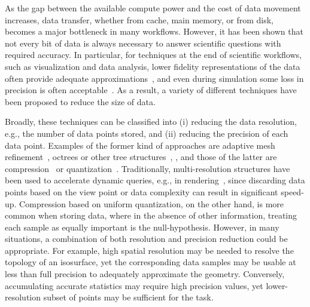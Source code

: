 As the gap between the available compute power and the cost of data movement
increases, data transfer, whether from cache, main memory, or from disk,
becomes a major bottleneck in many workflows. However, it has been shown that
not every bit of data is always necessary to answer scientific questions with
required accuracy. In particular, for techniques at the end of scientific
workflows, such as visualization and data analysis, lower fidelity
representations of the data often provide adequate
approximations~\cite{woodring2011,covra2012,compression_sim2013}, and even
during simulation some loss in precision is often
acceptable~\cite{compression_sim2013,doi:10.1177/1094342018762036}.  As a
result, a variety of different techniques have been proposed to reduce the size
of data. 

Broadly, these techniques can be classified into (i) reducing the data
resolution, e.g., the number of data points stored, and (ii) reducing the
precision of each data point.  Examples of the former kind of approaches are
adaptive mesh refinement~\cite{amr1989}, octrees or other tree
structures~\cite{hierarchical1984}, , and those of the
latter are compression~\cite{fpzip,isabela,zfp2014,sz} or
quantization~\cite{vq1992,compression_domain2003,sqe}. Traditionally,
multi-resolution structures have been used to accelerate dynamic queries, e.g.,
in rendering~\cite{multires_octree1999}, since discarding data points based on
the view point or data complexity can result in significant speed-up.
Compression based on uniform quantization, on the other hand, is more common
when storing data, where in the absence of other information, treating each
sample as equally important is the null-hypothesis. However, in many
situations, a combination of both resolution and precision reduction could be
appropriate.  For example, high spatial resolution may be needed to resolve the
topology of an isosurface, yet the corresponding data samples may be usable at
less than full precision to adequately approximate the geometry.  Conversely,
accumulating accurate statistics may require high precision values, yet
lower-resolution subset of points may be sufficient for the task. 


